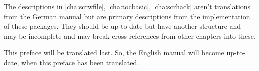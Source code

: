 The descriptions in \autoref{cha:scrwfile}, \autoref{cha:tocbasic},
\autoref{cha:scrhack} aren't translations from the German manual but are
primary descriptions from the implementation of these packages. They should be
up-to-date but have another structure and may be incomplete and may break
cross references from other chapters into these.

This preface will be translated last. So, the English manual will become
up-to-date, when this preface has been translated.

\endinput



